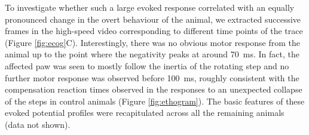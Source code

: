To investigate whether such a large evoked response correlated with an equally pronounced change in the overt behaviour of the animal, we extracted successive frames in the high-speed video corresponding to different time points of the trace (Figure \ref{fig:ecog}C). Interestingly, there was no obvious motor response from the animal up to the point where the negativity peaks at around \SI{70}{\milli\second}. In fact, the affected paw was seen to mostly follow the inertia of the rotating step and no further motor response was observed before \SI{100}{\milli\second}, roughly consistent with the compensation reaction times observed in the responses to an unexpected collapse of the steps in control animals (Figure \ref{fig:ethogram}). The basic features of these evoked potential profiles were recapitulated across all the remaining animals (data not shown).